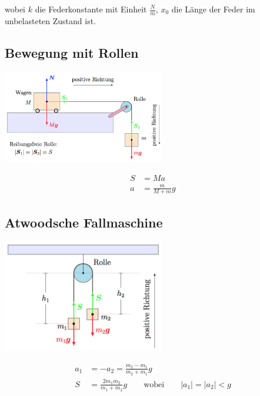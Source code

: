 \documentclass[7pt]{article}
\begin{document}
\begin{multicols*}{3}
wobei $k$ die Federkonstante mit Einheit $\frac{N}{m}$, $x_0$ die L{\"a}nge der Feder im unbelasteten Zustand ist.

\subsection{Bewegung mit Rollen}

\begin{center}
	\includegraphics[width=200pt]{images/bewegung_rollen}
\end{center}

\begin{equation*}
\begin{split}
	S & = Ma \\
	a & = \frac{m}{M + m}g
\end{split}
\end{equation*}

\subsection{Atwoodsche Fallmaschine}

\begin{center}
	\includegraphics[width=200pt]{images/fallmaschine}
\end{center}

\begin{equation*}
\begin{split}
	a_1 & = -a_2 = \frac{m_2-m_1}{m_2+m_1}g \\
	  S & = \frac{2m_1m_2}{m_1+m_2}g \qquad\text{wobei}\qquad |a_1|=|a_2| < g
\end{split}
\end{equation*}


\end{multicols*}
\end{document}
